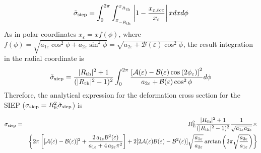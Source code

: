 \begin{equation}
\tilde{\sigma}_{\rm siep}= \int_{0}^{2\pi}\int_{x_{_{-R_{\rm th}}}}^{x_{_{R_{\rm th}}}}\left| 1-\dfrac{x_{\varepsilon,tcc}}{x_{\varepsilon}}\right| x dx d\phi 
\end{equation}
As in polar coordinates $x_{\varepsilon}=xf(\phi)$, where $f(\phi)=\sqrt{a_{1\varepsilon}\cos^2{\phi}+a_{2\varepsilon}\sin^2{\phi}}=\sqrt{a_{2\varepsilon}+\mathcal{B}(\varepsilon)\cos^2{\phi}}$, the result integration in the radial coordinate is
\begin{equation}
\tilde{\sigma}_{\rm siep}= \dfrac{|R_{\rm th}|^2+1}{(|R_{\rm th}|^2-1)^2}
\int_{0}^{2\pi}\dfrac{\left[\mathcal{A}(\varepsilon)-\mathcal{B}(\varepsilon)\cos{
(2\phi_\varepsilon)} \right]^2}{a_{2\varepsilon}+\mathcal{B}(\varepsilon)\cos^2{\phi}} d\phi 
\end{equation}
Therefore, the analytical expression for the deformation cross section for the SIEP ($\sigma_{\rm siep}=R^2_{\rm E}\tilde{\sigma}_{\rm siep}$) is

\begin{eqnarray}
\sigma_{\rm siep}&=& R^2_{\rm E}\dfrac{|R_{\rm th}|^2+1}{(|R_{\rm th}|^2-1)^2}\dfrac{1}{\sqrt{a_{1\varepsilon} a_{2\varepsilon}}}\times \nonumber \\
& & \left\{2\pi\left[ [\mathcal{A}(\varepsilon)-\mathcal{B}(\varepsilon)]^2+\frac{2\,a_{1\varepsilon}\mathcal{B}^2(\varepsilon)}{a_{1\varepsilon}+4\,a_{2\varepsilon}\pi^{2}} \right]+ 2[2\mathcal{A}(\varepsilon)\mathcal{B}(\varepsilon)-\mathcal{B}^2(\varepsilon)]\sqrt{\frac{a_{1\varepsilon}}{a_{2\varepsilon}}}\arctan{\left( 2\pi\sqrt{\frac{a_{2\varepsilon}}{a_{1\varepsilon}}}\right)} \right\} \nonumber \\
\end{eqnarray}




